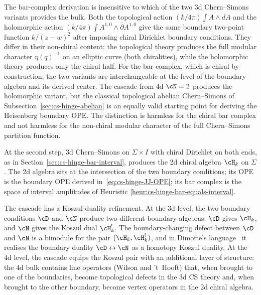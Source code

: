 \begin{remark}
\label{rem:cs-hinge-holomorphic-vs-topological}
The bar-complex derivation is insensitive to which of the two
3d Chern--Simons variants provides the bulk. Both the
topological action $(k/4\pi)\int A\wedge dA$ and the holomorphic
action $(k/4\pi)\int A^{1,0}\wedge\bar\partial A^{1,0}$ give the
same boundary two-point function $k/(z - w)^2$ after imposing
chiral Dirichlet boundary conditions. They differ in their
non-chiral content: the topological theory produces the full
modular character $\eta(q)^{-1}$ on an elliptic curve (both
chiralities), while the holomorphic theory produces only the
chiral half. For the bar complex, which is chiral by
construction, the two variants are interchangeable at the level
of the boundary algebra and its derived center. The cascade
from 4d $\cN = 2$ produces the holomorphic variant,
but the classical topological abelian Chern--Simons of
Subsection~\ref{sec:cs-hinge-abelian} is an equally valid starting
point for deriving the Heisenberg boundary OPE. The distinction is
harmless for the chiral bar complex and not harmless for the
non-chiral modular character of the full Chern--Simons partition
function.
\end{remark}

At the second step, 3d Chern--Simons on $\Sigma \times I$ with
chiral Dirichlet on both ends, as in
Section~\ref{sec:cs-hinge-bar-interval}, produces the 2d chiral
algebra $\cH_k$ on $\Sigma$. The 2d algebra sits at the
intersection of the two boundary conditions; its OPE is the
boundary OPE derived in~\eqref{eq:cs-hinge-JJ-OPE}; its bar
complex is the space of interval amplitudes of Heuristic
\ref{heur:cs-hinge-bar-equals-interval}.

The cascade has a Koszul-duality refinement. At the 3d level,
the two boundary conditions $\cD$ and $\cN$ produce two different
boundary algebras: $\cD$ gives $\cH_k$, and $\cN$ gives the Koszul
dual $\cH_k^!$. The boundary-changing defect between $\cD$ and
$\cN$ is a bimodule for the pair $(\cH_k, \cH_k^!)$, and in
Dimofte's language~\cite{CostelloGaiotto2020} it realises the
boundary duality $\cD \leftrightarrow \cN$ as a homotopy
Koszul duality. At the 4d level, the cascade equips the
Koszul pair with an additional layer of structure: the 4d
bulk contains line operators (Wilson and 't~Hooft) that, when
brought to one of the boundaries, become topological defects in
the 3d CS theory and, when brought to the other boundary,
become vertex operators in the 2d chiral algebra.

